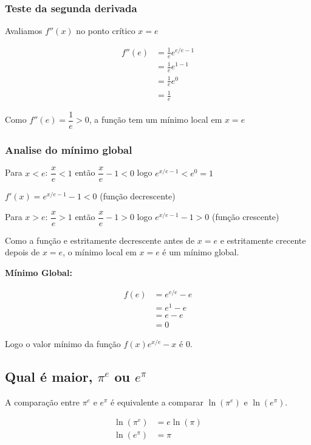 \documentclass[../resumo.tex]{subfiles}
\begin{document}
	\subsubsection{Teste da segunda derivada}

	Avaliamos $f''(x)$ no ponto crítico $x = e$

	\begin{align*}
		f''(e) &= \frac{1}{e} e^{e/e -1} \\
					 &= \frac{1}{e} e^{1 - 1} \\
					 &= \frac{1}{e} e^0 \\
					 &= \frac{1}{e}
	\end{align*}

	Como $f''(e) = \dfrac{1}{e} > 0$, a função tem um mínimo local em $x = e$

	\subsubsection{Analise do mínimo global}

	Para $x < e$: $\dfrac{x}{e} < 1$ então $\dfrac{x}{e} - 1 < 0$ logo $e^{x/e -1} < e^0 = 1$

	$f'(x) = e^{x/e-1}-1 < 0$ (função decrescente)

	Para $x > e$: $\dfrac{x}{e} > 1$ então $\dfrac{x}{e} - 1 > 0$ logo $e^{x/e -1} -1 > 0$ (função crescente)

	Como a função e estritamente decrescente antes de $x = e$ e estritamente crecente depois de $x = e$,
	o mínimo local em $x = e$ é um mínimo global.

	\textbf{Mínimo Global:}

	\begin{align*}
		f(e) &= e^{e/e} - e \\
				 &= e^1 - e \\
				 &= e - e \\
				 &= 0
	\end{align*}

	Logo o valor mínimo da função $f(x) e^{x/e}-x$ é $0$.

	\subsection{Qual é maior, $\pi^e$ ou $e^\pi$}

	A comparação entre $\pi^e$ e $e^\pi$ é equivalente a comparar $\ln(\pi^e)$ e $\ln(e^\pi)$.

	\begin{align*}
		\ln(\pi^e) &= e \ln(\pi) \\
		\ln(e^\pi) &= \pi
	\end{align*}
\end{document}
